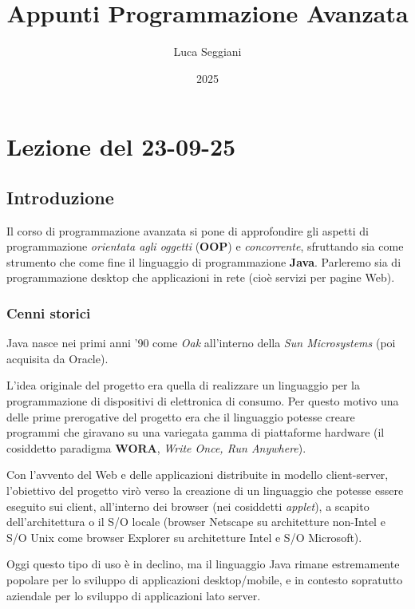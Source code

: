 \documentclass[a4paper,11pt]{article}
\title{Appunti Programmazione Avanzata}
\author{Luca Seggiani}
\date{2025}
\begin{document}
\section{Lezione del 23-09-25}

\thispagestyle{empty}
\pagestyle{fancy}

\subsection{Introduzione}
Il corso di programmazione avanzata si pone di approfondire gli aspetti di programmazione \textit{orientata agli oggetti} (\textbf{OOP}) e \textit{concorrente}, sfruttando sia come strumento che come fine il linguaggio di programmazione \textbf{Java}.
Parleremo sia di programmazione desktop che applicazioni in rete (cioè servizi per pagine Web).

\subsubsection{Cenni storici}
Java nasce nei primi anni '90 come \textit{Oak} all'interno della \textit{Sun Microsystems} (poi acquisita da Oracle).

L'idea originale del progetto era quella di realizzare un linguaggio per la programmazione di dispositivi di elettronica di consumo.
Per questo motivo una delle prime prerogative del progetto era che il linguaggio potesse creare programmi che giravano su una variegata gamma di piattaforme hardware (il cosiddetto paradigma \textbf{WORA}, \textit{Write Once, Run Anywhere}).

Con l'avvento del Web e delle applicazioni distribuite in modello client-server, l'obiettivo del progetto virò verso la creazione di un linguaggio che potesse essere eseguito sui client, all'interno dei browser (nei cosiddetti \textit{applet}), a scapito dell'architettura o il S/O locale (browser Netscape su architetture non-Intel e S/O Unix come browser Explorer su architetture Intel e S/O Microsoft).

Oggi questo tipo di uso è in declino, ma il linguaggio Java rimane estremamente popolare per lo sviluppo di applicazioni desktop/mobile, e in contesto sopratutto aziendale per lo sviluppo di applicazioni lato server.
\end{document}
